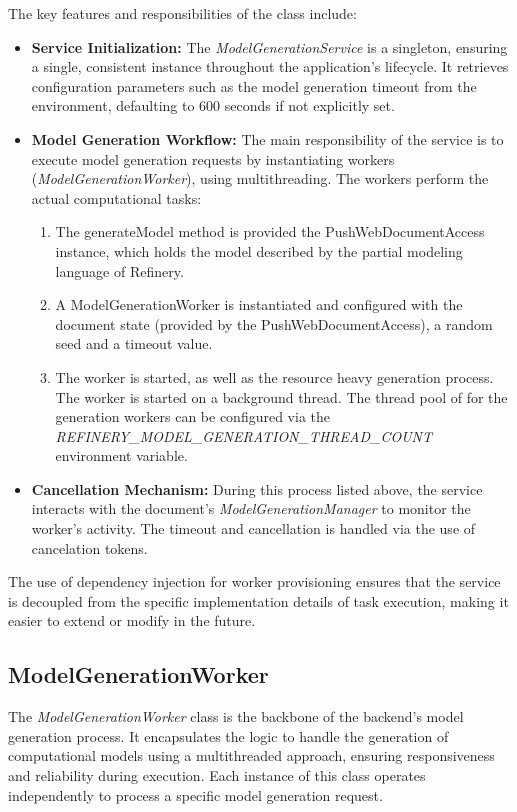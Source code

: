 			The key features and responsibilities of the class include:
			\begin{itemize}
				\item{\textbf{Service Initialization:}} The \textit{ModelGenerationService} is a singleton, 
				ensuring a single, consistent instance throughout the application's lifecycle.
				It retrieves configuration parameters such as the model generation timeout 
				from the environment, defaulting to 600 seconds if not explicitly set.
				\item{\textbf{Model Generation Workflow:}} The main responsibility of the service is to execute model generation requests 
				by instantiating workers (\textit{ModelGenerationWorker}), using multithreading. 
				The workers perform the actual computational tasks:
				\begin{enumerate}
					\item The generateModel method is provided the PushWebDocumentAccess instance, which holds the model described by the partial modeling language
					of Refinery.
					\item A ModelGenerationWorker is instantiated and configured with the document state (provided by the PushWebDocumentAccess), 
					a random seed and a timeout value.
					\item The worker is started, as well as the resource heavy generation process. 
					The worker is started on a background thread. 
					The thread pool of for the generation workers can be configured via the 
					\textit{REFINERY\_MODEL\_GENERATION\_THREAD\_COUNT} \cite{generationthread} environment variable.
				\end{enumerate}
				\item{\textbf{Cancellation Mechanism:}}
				During this process listed above, the service interacts with the document’s \textit{ModelGenerationManager} to monitor the worker's activity.
				The timeout and cancellation is handled via the use of cancelation tokens.
			\end{itemize}
			The use of dependency injection for worker provisioning ensures that the service is decoupled from the specific implementation details of task execution, making it easier to extend or modify in the future.

		\subsection{ModelGenerationWorker}
			The \textit{ModelGenerationWorker} class is the backbone of the backend’s model generation process. 
			It encapsulates the logic to handle the generation of computational models using a multithreaded approach, 
			ensuring responsiveness and reliability during execution. 
			Each instance of this class operates independently to process a specific model generation request.	

